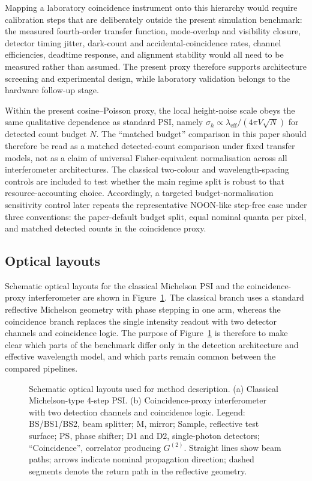 \documentclass[photonics,article,submit,pdftex,moreauthors]{Definitions/mdpi}
\begin{document}


Mapping a laboratory coincidence instrument onto this hierarchy would require calibration steps that are deliberately outside the present simulation benchmark: the measured fourth-order transfer function, mode-overlap and visibility closure, detector timing jitter, dark-count and accidental-coincidence rates, channel efficiencies, deadtime response, and alignment stability would all need to be measured rather than assumed. The present proxy therefore supports architecture screening and experimental design, while laboratory validation belongs to the hardware follow-up stage.

Within the present cosine--Poisson proxy, the local height-noise scale obeys the same qualitative dependence as standard PSI, namely $\sigma_h\propto \lambda_\mathrm{eff}/(4\pi V\sqrt{N})$ for detected count budget $N$. The ``matched budget'' comparison in this paper should therefore be read as a matched detected-count comparison under fixed transfer models, not as a claim of universal Fisher-equivalent normalisation across all interferometer architectures. The classical two-colour and wavelength-spacing controls are included to test whether the main regime split is robust to that resource-accounting choice.
Accordingly, a targeted budget-normalisation sensitivity control later repeats the representative NOON-like step-free case under three conventions: the paper-default budget split, equal nominal quanta per pixel, and matched detected counts in the coincidence proxy.

\subsection{Optical layouts}
Schematic optical layouts for the classical Michelson PSI and the coincidence-proxy interferometer are shown in Figure~\ref{fig:layouts}. The classical branch uses a standard reflective Michelson geometry with phase stepping in one arm, whereas the coincidence branch replaces the single intensity readout with two detector channels and coincidence logic. The purpose of Figure~\ref{fig:layouts} is therefore to make clear which parts of the benchmark differ only in the detection architecture and effective wavelength model, and which parts remain common between the compared pipelines.

\begin{figure}[t]
\centering

\caption{Schematic optical layouts used for method description. (a) Classical Michelson-type 4-step PSI. (b) Coincidence-proxy interferometer with two detection channels and coincidence logic. Legend: BS/BS1/BS2, beam splitter; M, mirror; Sample, reflective test surface; PS, phase shifter; D1 and D2, single-photon detectors; ``Coincidence'', correlator producing $G^{(2)}$. Straight lines show beam paths; arrows indicate nominal propagation direction; dashed segments denote the return path in the reflective geometry.}
\label{fig:layouts}
\end{figure}
\unskip
\end{document}
